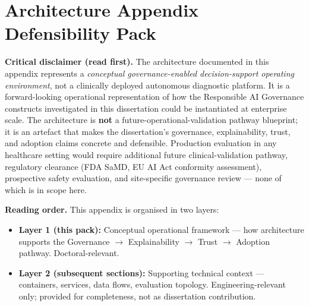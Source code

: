
\section*{Architecture Appendix Defensibility Pack}
\label{sec:appo_defensibility_pack}

\noindent\textbf{Critical disclaimer (read first).} The architecture documented in this appendix represents a \emph{conceptual governance-enabled decision-support operating environment}, not a clinically deployed autonomous diagnostic platform. It is a forward-looking operational representation of how the Responsible AI Governance constructs investigated in this dissertation could be instantiated at enterprise scale. The architecture is \textbf{not} a future-operational-validation pathway blueprint; it is an artefact that makes the dissertation's governance, explainability, trust, and adoption claims concrete and defensible. Production evaluation in any healthcare setting would require additional future clinical-validation pathway, regulatory clearance (FDA SaMD, EU AI Act conformity assessment), prospective safety evaluation, and site-specific governance review --- none of which is in scope here.

\noindent\textbf{Reading order.} This appendix is organised in two layers:
\begin{itemize}[leftmargin=*, itemsep=2pt]
    \item \textbf{Layer 1 (this pack):} Conceptual operational framework --- how architecture supports the Governance $\to$ Explainability $\to$ Trust $\to$ Adoption pathway. Doctoral-relevant.
    \item \textbf{Layer 2 (subsequent sections):} Supporting technical context --- containers, services, data flows, evaluation topology. Engineering-relevant only; provided for completeness, not as dissertation contribution.
\end{itemize}

